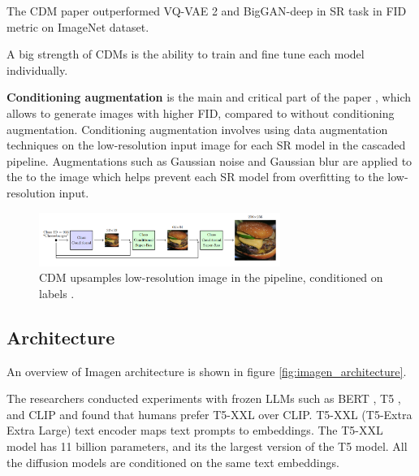The CDM paper \cite{cascaded_diffusion_models} outperformed VQ-VAE 2 \cite{vqvae2} and BigGAN-deep \cite{biggan_deep} in SR task in FID metric on ImageNet dataset.

A big strength of CDMs is the ability to train and fine tune each model individually.

\textbf{Conditioning augmentation} is the main and critical part of the paper \cite{cascaded_diffusion_models}, which allows to generate images with higher FID, compared to without conditioning augmentation. Conditioning augmentation involves using data augmentation techniques on the low-resolution input image for each SR model in the cascaded pipeline. Augmentations such as Gaussian noise and Gaussian blur are applied to the  to the image which helps prevent each SR model from overfitting to the low-resolution input.

\begin{figure}
    \centering
    \includegraphics[width=0.7\textwidth]{images/imagen/cdm_architecture.png}
    \caption{CDM upsamples low-resolution image in the pipeline, conditioned on labels \cite{cascaded_diffusion_models}.}
    \label{fig:imagen_cdm_architecture}
\end{figure}























\subsection{Architecture}

An overview of Imagen architecture is shown in figure \ref{fig:imagen_architecture}.

The researchers conducted experiments with frozen LLMs such as BERT \cite{bert}, T5 \cite{t5_model}, and CLIP \cite{openai_clip} and found that humans prefer T5-XXL over CLIP. T5-XXL (T5-Extra Extra Large) text encoder maps text prompts to embeddings. The T5-XXL model has 11 billion parameters, and its the largest version of the T5 model. All the diffusion models are conditioned on the same text embeddings.

